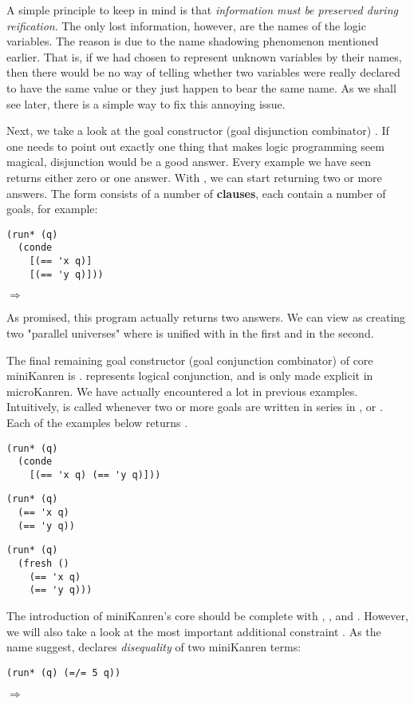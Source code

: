 A simple principle to keep in mind is that \textit{information must be preserved during reification}. The only lost information, however, are the names of the logic variables. The reason is due to the name shadowing phenomenon mentioned earlier. That is, if we had chosen to represent unknown variables by their names, then there would be no way of telling whether two variables were really declared to have the same value or they just happen to bear the same name. As we shall see later, there is a simple way to fix this annoying issue.

Next, we take a look at the goal constructor (goal disjunction combinator) .
If one needs to point out exactly one thing that makes logic programming seem magical, disjunction would be a good answer. Every example we have seen returns either zero or one answer. With , we can start returning two or more answers. The  form consists of a number of \textbf{clauses}, each contain a number of goals, for example:

\begin{lstlisting}
(run* (q)
  (conde
    [(== 'x q)]
    [(== 'y q)]))
\end{lstlisting}
$\Rightarrow$ 

As promised, this program actually returns two answers. We can view  as creating two "parallel universes" where  is unified with  in the first and  in the second.

The final remaining goal constructor (goal conjunction combinator) of core miniKanren is .  represents logical conjunction, and is only made explicit in microKanren. We have actually encountered  a lot in previous examples. Intuitively,  is called whenever two or more goals are written in series in ,  or . Each of the examples below returns \code{()}.
\begin{lstlisting}
(run* (q)
  (conde
    [(== 'x q) (== 'y q)]))
\end{lstlisting}

\begin{lstlisting}
(run* (q)
  (== 'x q)
  (== 'y q))
\end{lstlisting}

\begin{lstlisting}
(run* (q)
  (fresh ()
    (== 'x q)
    (== 'y q)))
\end{lstlisting}

The introduction of miniKanren's core should be complete with \code{==}, ,  and . However, we will also take a look at the most important additional constraint \code{=/=}. As the name suggest, \code{=/=} declares \textit{disequality} of two miniKanren terms:
\begin{lstlisting}
(run* (q) (=/= 5 q))
\end{lstlisting}
$\Rightarrow$ 

